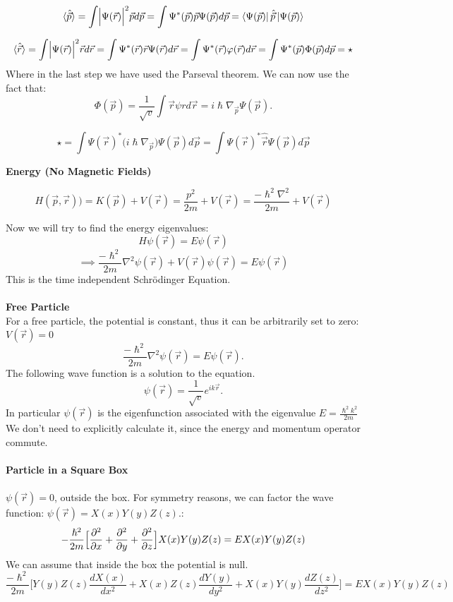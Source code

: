 \documentclass{article}
\begin{document}
$$\langle \hat{\vec{p}} \rangle = \int \Bigl| \Psi(\vec{r}) \Bigl|^2 \vec{p} d\vec{p} = \int \Psi^* (\vec{p}) \vec{p} \Psi(\vec{p}) d\vec{p} = \bra{\Psi(\vec{p})}\hat{\vec{p}} \ket{\Psi(\vec{p})} $$ 

$$\langle \hat{\vec{r}} \rangle = \int \Bigl| \Psi(\vec{r}) \Bigl|^2 \vec{r} d\vec{r} = \int \Psi^* (\vec{r}) \vec{r} \Psi(\vec{r}) d\vec{r} =\int \Psi^* (\vec{r}) \varphi(\vec{r}) d\vec{r}  = \int \Psi^* (\vec{p})\Phi(\vec{p}) d\vec{p} =  \star $$
Where in the last step we have used the Parseval theorem.
We can now use the fact that:
$$ \Phi(\vec{p}) = \frac{1}{\sqrt{v}} \int \vec{r} \psi{r} d\vec{r} = i \hslash \nabla_{\vec{p}} \Psi(\vec{p}).$$

$$ \star =  \int \Psi(\vec{r})^* \bigl( i \hslash \nabla_{\vec{p}} \bigl) \Psi(\vec{p}) d\vec{p} = \int \Psi(\vec{r})^* \hat{\vec{r}} \Psi(\vec{p})  d\vec{p}$$

\textbf{Energy (No Magnetic Fields)}

$$H(\vec{p},\vec{r})) = K(\vec{p}) + V(\vec{r}) = \frac{p^2}{2m} + V(\vec{r}) = \frac{-\hslash^2 \nabla^2}{2m} + V(\vec{r})$$

Now we will try to find the energy eigenvalues:
$$H \psi(\vec{r}) = E\psi(\vec{r})$$
$$\implies \frac{-\hslash^2}{2m} \nabla^2 \psi(\vec{r}) + V(\vec{r})\psi(\vec{r}) = E\psi(\vec{r})$$
This is the time independent Schrödinger Equation.\\ \\
\textbf{Free Particle} \\
For a free particle, the potential is constant, thus it can be arbitrarily set to zero: $V(\vec{r}) = 0$
$$\frac{-\hslash^2}{2m} \nabla^2 \psi(\vec{r}) = E\psi(\vec{r}).$$
The following wave function is a solution to the equation.
$$\psi(\vec{r}) = \frac{1}{\sqrt{v}}e^{ik\vec{r}}.$$
In particular $\psi(\vec{r})$ is the eigenfunction associated with the eigenvalue $E=\frac{\hslash^2k^2}{2m}$
We don't need to explicitly calculate it, since the energy and momentum operator commute.\\ \\ 
\textbf{Particle in a Square Box} \\ \\
$\psi(\vec{r}) =0$, outside the box.
For symmetry reasons, we can factor the wave function: $\psi(\vec{r}) = X(x)Y(y)Z(z).$: 
$$-\frac{\hslash^2}{2m} \Bigl[ \frac{\partial^2}{\partial x} + \frac{\partial^2}{\partial y}+\frac{\partial^2}{\partial z} \Bigl] X(x)Y(y)Z(z) = EX(x)Y(y)Z(z)$$
We can assume that inside the box the potential is null.
$$\frac{-\hslash^2}{2m} \Biggl[ Y(y)Z(z) \frac{dX(x)}{dx^2} + X(x)Z(z) \frac{dY(y)}{dy^2} + X(x)Y(y) \frac{dZ(z)}{dz^2} \Biggl]  = EX(x)Y(y)Z(z)$$
\end{document}
